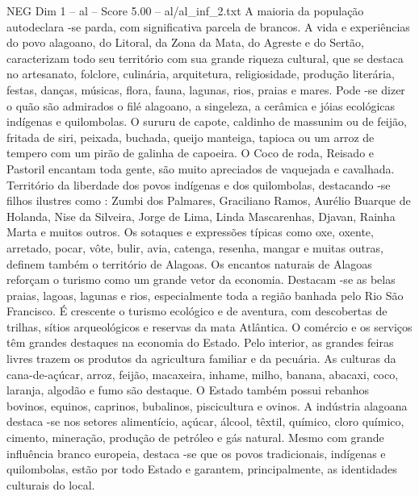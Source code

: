 \begin{textsample}{NEG Dim 1 – al – Score 5.00 – al/al\_inf\_2.txt}
A maioria da população autodeclara -se parda, com significativa parcela de brancos.
A vida e experiências do povo alagoano, do Litoral, da Zona da Mata, do Agreste e do Sertão, caracterizam todo seu território com sua grande riqueza cultural, que se destaca no artesanato, folclore, culinária, arquitetura, religiosidade, produção literária, festas, danças, músicas, flora, fauna, lagunas, rios, praias e mares.
Pode -se dizer o quão são admirados o filé alagoano, a singeleza, a cerâmica e jóias ecológicas indígenas e quilombolas.
O sururu de capote, caldinho de massunim ou de feijão, fritada de siri, peixada, buchada, queijo manteiga, tapioca ou um arroz de tempero com um pirão de galinha de capoeira.
O Coco de roda, Reisado e Pastoril encantam toda gente, são muito apreciados de vaquejada e cavalhada.
Território da liberdade dos povos indígenas e dos quilombolas, destacando -se filhos ilustres como : Zumbi dos Palmares, Graciliano Ramos, Aurélio Buarque de Holanda, Nise da Silveira, Jorge de Lima, Linda Mascarenhas, Djavan, Rainha Marta e muitos outros.
Os sotaques e expressões típicas como oxe, oxente, arretado, pocar, vôte, bulir, avia, catenga, resenha, mangar e muitas outras, definem também o território de Alagoas.
Os encantos naturais de Alagoas reforçam o turismo como um grande vetor da economia.
Destacam -se as belas praias, lagoas, lagunas e rios, especialmente toda a região banhada pelo Rio São Francisco.
É crescente o turismo ecológico e de aventura, com descobertas de trilhas, sítios arqueológicos e reservas da mata Atlântica.
O comércio e os serviços têm grandes destaques na economia do Estado.
Pelo interior, as grandes feiras livres trazem os produtos da agricultura familiar e da pecuária.
As culturas da cana-de-açúcar, arroz, feijão, macaxeira, inhame, milho, banana, abacaxi, coco, laranja, algodão e fumo são destaque.
O Estado também possui rebanhos bovinos, equinos, caprinos, bubalinos, piscicultura e ovinos.
A indústria alagoana destaca -se nos setores alimentício, açúcar, álcool, têxtil, químico, cloro químico, cimento, mineração, produção de petróleo e gás natural.
Mesmo com grande influência branco europeia, destaca -se que os povos tradicionais, indígenas e quilombolas, estão por todo Estado e garantem, principalmente, as identidades culturais do local.

\end{textsample}
